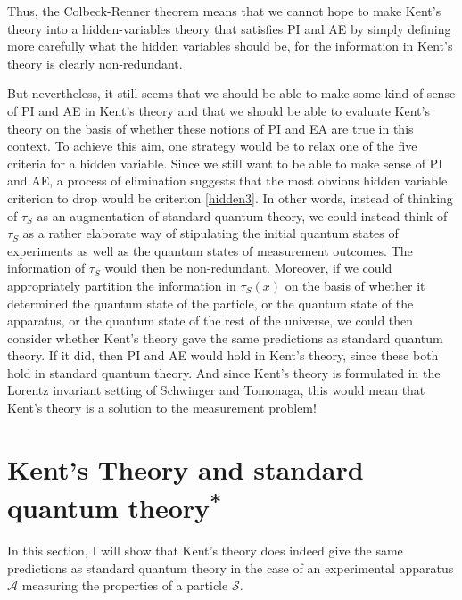 Thus, the Colbeck-Renner theorem means that we cannot hope to make Kent's theory into a hidden-variables theory that satisfies PI and AE by simply defining more carefully what the hidden variables should be, for the information in Kent's theory is clearly non-redundant.

But nevertheless, it still seems that we should be able to make some kind of sense of PI and AE in Kent's theory and that we should be able to evaluate Kent's theory on the basis of whether these notions of PI and EA are true in this context. To achieve this aim, one strategy would be to relax one of the five criteria for a hidden variable. Since we still want to be able to make sense of PI and AE,  a process of elimination suggests that the most obvious hidden variable criterion to drop would be criterion \ref{hidden3}. In other words, instead of thinking of $\tau_S$ as an augmentation of standard quantum theory, we could instead think of $\tau_S$ as a rather elaborate way of stipulating the initial quantum states of experiments as well as the quantum states of measurement outcomes. The information of $\tau_S$ would then be non-redundant. Moreover, if we could appropriately partition the information in $\tau_S(x)$ on the basis of whether it determined the quantum state of the particle, or the quantum state of the apparatus, or the quantum state of the rest of the universe, we could then consider whether Kent's theory gave the same predictions as standard quantum theory. If it did, then PI and AE would hold in Kent's theory, since these both hold in standard quantum theory. And since Kent's theory is formulated in the Lorentz invariant setting of Schwinger and Tomonaga, this would mean that Kent's theory is a solution to the measurement problem!

\section{Kent's Theory and standard quantum theory\textsuperscript{*}\label{KentconsistentQT}}
In this section, I will show that Kent's theory does indeed give the same predictions as standard quantum theory in the case of an experimental apparatus $\mathcal{A}$ measuring the properties of a particle $\mathcal{S}$.

